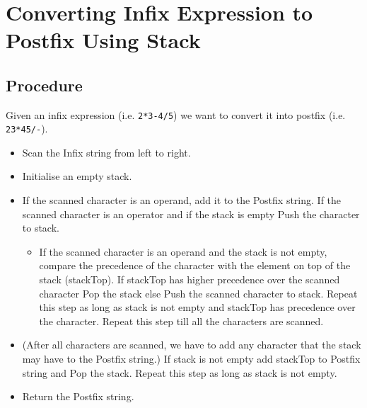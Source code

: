 \documentclass[a4paper, 11pt]{article}
\title{\vspace{1in}\textmd{ \hmwkClass\ \hmwkSubTitle\\ \hmwkTitle\ifthenelse{\equal{\hmwkSubTitle}{}}{}}\\\normalsize\vspace{0.1in}{Due\ on\ \hmwkDueDate}\\\vspace{0.1in}\large{\hmwkClassInstructor\ \hmwkClassTime}\vspace{2.4in}}
\date{}
\author{\textbf{\hmwkAuthorName}}
\begin{document}



\maketitle 
\tableofcontents
\newpage





\section{Converting Infix Expression to Postfix Using Stack}

\subsection{Procedure}
Given an infix expression (i.e. \verb|2*3-4/5|) we want to convert it into postfix (i.e. \verb|23*45/-|). 

\begin{itemize}

\item    Scan the Infix string from left to right.
\item    Initialise an empty stack.
\item    If the scanned character is an operand, add it to the Postfix string. If the scanned character is an operator and if the stack is empty Push the character to stack.
    \begin{itemize}
    \item If the scanned character is an operand and the stack is not empty, compare the precedence of the character with the element on top of the stack (stackTop). If stackTop has higher precedence over the scanned character Pop the stack else Push the scanned character to stack. Repeat this step as long as stack is not empty and stackTop has precedence over the character.
    Repeat this step till all the characters are scanned.
    \end{itemize}
\item (After all characters are scanned, we have to add any character that the stack may have to the Postfix string.) If stack is not empty add stackTop to Postfix string and Pop the stack. Repeat this step as long as stack is not empty.
\item    Return the Postfix string. 
\end{itemize}
\end{document}
